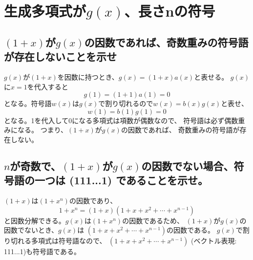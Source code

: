 \documentclass[a4paper,11pt]{jsarticle}
\begin{document}
\section{生成多項式が$g(x)$、長さnの符号}
\subsection{$(1+x)$が$g(x)$の因数であれば、奇数重みの符号語が存在しないことを示せ}
$g(x)$が$(1+x)$を因数に持つとき、$g(x)=(1+x)a(x)$と表せる。
$g(x)$に$x=1$を代入すると
\[
  g(1)=(1+1)a(1)=0
\]
となる。符号語$w(x)$は$g(x)$で割り切れるので$w(x)=b(x)g(x)$と表せ、
\[
  w(1)=b(1)g(1)=0
\]
となる。1を代入して0になる多項式は項数が偶数なので、
符号語は必ず偶数重みになる。
つまり、$(1+x)$が$g(x)$の因数であれば、
奇数重みの符号語が存在しない。

\subsection{$n$が奇数で、$(1+x)$が$g(x)$の因数でない場合、符号語の一つは (111...1) であることを示せ。}
$(1+x)$は$(1+x^n)$の因数であり、
\[
  1+x^n=(1+x)(1+x+x^2+ \cdots +x^{n-1})
\]
と因数分解できる。$g(x)$は$(1+x^n)$の因数であるため、
$(1+x)$が$g(x)$の因数でないとき、$g(x)$は
$(1+x+x^2+ \cdots + x^{n-1})$の因数である。
$g(x)$で割り切れる多項式は符号語なので、
$(1+x+x^2+ \cdots + x^{n-1})$ (ベクトル表現: 111...1)も符号語である。
\end{document}
